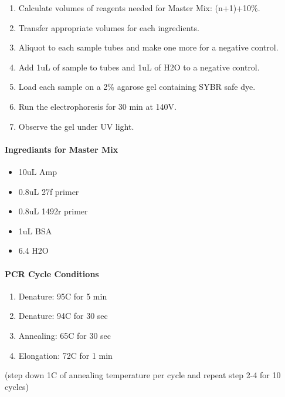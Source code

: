 \documentclass[]{article}
\providecommand{\tightlist}{%
  \setlength{\itemsep}{0pt}\setlength{\parskip}{0pt}}
\let\oldparagraph\paragraph
\renewcommand{\paragraph}[1]{\oldparagraph{#1}\mbox{}}
\begin{document}
\begin{enumerate}
\def\labelenumi{\arabic{enumi}.}
\tightlist
\item
  Calculate volumes of reagents needed for Master Mix: (n+1)+10\%.
\item
  Transfer appropriate volumes for each ingredients.
\item
  Aliquot to each sample tubes and make one more for a negative control.
\item
  Add 1uL of sample to tubes and 1uL of H2O to a negative control.
\item
  Load each sample on a 2\% agarose gel containing SYBR safe dye.
\item
  Run the electrophoresis for 30 min at 140V.
\item
  Observe the gel under UV light.
\end{enumerate}

\hypertarget{ingrediants-for-master-mix}{%
\paragraph{Ingrediants for Master
Mix}\label{ingrediants-for-master-mix}}

\begin{itemize}
\tightlist
\item
  10uL Amp
\item
  0.8uL 27f primer
\item
  0.8uL 1492r primer
\item
  1uL BSA
\item
  6.4 H2O
\end{itemize}

\hypertarget{pcr-cycle-conditions}{%
\paragraph{PCR Cycle Conditions}\label{pcr-cycle-conditions}}

\begin{enumerate}
\def\labelenumi{\arabic{enumi}.}
\tightlist
\item
  Denature: 95C for 5 min
\item
  Denature: 94C for 30 sec
\item
  Annealing: 65C for 30 sec
\item
  Elongation: 72C for 1 min
\end{enumerate}

(step down 1C of annealing temperature per cycle and repeat step 2-4 for
10 cycles)
\end{document}

